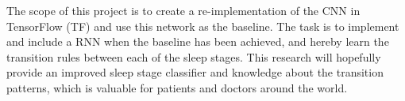 The scope of this project is to create a re-implementation of the CNN \cite{main_ar} in TensorFlow (TF) and use this network as the baseline.  
The task is to implement and include a RNN when the baseline has been achieved, and hereby learn the transition rules between each of the sleep stages. 
This research will hopefully provide an improved sleep stage classifier and knowledge about the transition patterns, which is valuable for patients and doctors around the world. 
